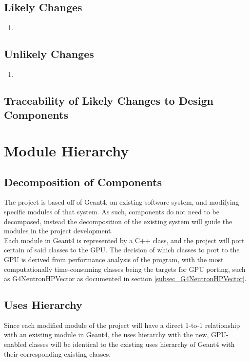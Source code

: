 \documentclass[12pt]{article}
\begin{document}
\subsection{Likely Changes} %
\begin{enumerate}
\item
\end{enumerate}

\subsection{Unlikely Changes} %
\begin{enumerate}
\item
\end{enumerate}

\subsection{Traceability of Likely Changes to Design Components}

\section{Module Hierarchy}%
\subsection{Decomposition of Components}
The project is based off of Geant4, an existing software system, and modifying specific modules of that system. As such, components do not need to be decomposed, instead the decomposition of the existing system will guide the modules in the project development.\\

Each module in Geant4 is represented by a C++ class, and the project will port certain of said classes to the GPU. The decision of which classes to port to the GPU is derived from performance analysis of the program, with the most computationally time-consuming classes being the targets for GPU porting, such as G4NeutronHPVector as documented in section \ref{subsec_G4NeutronHPVector}.

\subsection{Uses Hierarchy}
Since each modified module of the project will have a direct 1-to-1 relationship with an existing module in Geant4, the uses hierarchy with the new, GPU-enabled classes will be identical to the existing uses hierarchy of Geant4 with their corresponding existing classes.\\
\end{document}

